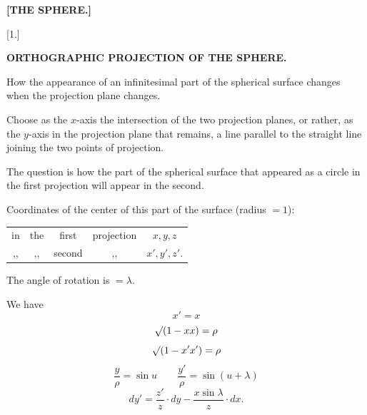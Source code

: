 \clearpage{}

\begin{center}
\large\bfseries [THE SPHERE.]
\end{center}

\begin{center}
[1.]
\end{center}

\begin{center}
\bfseries ORTHOGRAPHIC PROJECTION OF THE SPHERE.
\end{center}

\begin{center}
How the appearance of an infinitesimal part of the spherical surface changes\\
when the projection plane changes.
\end{center}

Choose as the $x$-axis the intersection of the two projection planes, or rather, as the $y$-axis in the projection plane that remains, a line parallel to the straight line joining the two points of projection.

The question is how the part of the spherical surface that appeared as a circle in the first projection will appear in the second.

Coordinates of the center of this part of the surface (radius $= 1$):

\begin{center}
\begin{tabular}{ccccc}
in & the & first & projection & $x,y,z$\\
,, & ,, & second & ,, & $x',y',z'$.
\end{tabular}
\end{center}

The angle of rotation is $= \lambda$.

We have
\[
x' = x
\]
\[
\mathord{\surd}(1-xx) = \rho
\]
\[
\mathord{\surd}(1-x'x') = \rho
\]
\[
\frac{y}{\rho} = \sin u \qquad \frac{y'}{\rho} = \sin(u+\lambda)
\]
\[
dy' = \frac{z'}{z}\cdot dy - \frac{x\sin\lambda}{z}\cdot dx.
\]
